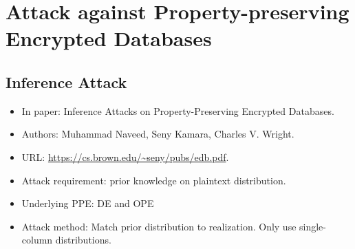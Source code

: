 \documentclass[12pt]{article}
\begin{document}
\section{Attack against Property-preserving Encrypted Databases}
\subsection{Inference Attack}
\begin{itemize}
	\item In paper: Inference Attacks on Property-Preserving Encrypted Databases.
	
	\item Authors: Muhammad Naveed, Seny Kamara, Charles V. Wright.
	
	\item URL: \url{https://cs.brown.edu/~seny/pubs/edb.pdf}.
	
	\item Attack requirement: prior knowledge on plaintext distribution.
	
	\item Underlying PPE: DE and OPE
	
	\item Attack method: Match prior distribution to realization. Only use single-column distributions.
\end{itemize}
\end{document}
